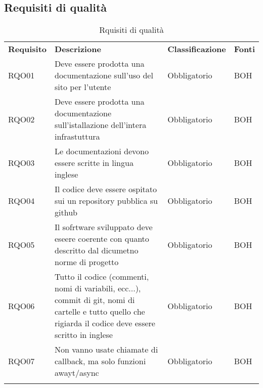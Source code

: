 \subsection{Requisiti di qualità}
\begin{center}
    \centering
    \renewcommand{\arraystretch}{1.8}
    \label{tab:RequisitiQualita}
    \begin{longtable}[!h]{p{50px} p{200px} p{100px} p{50px}}
        \rowcolor{logo!70} \textbf{Requisito} & \textbf{Descrizione}                                                                                                                                        & \textbf{Classificazione} & \textbf{Fonti} \\
        RQO01                                 & Deve essere prodotta una documentazione sull'uso del sito per l'utente                                                                                      & Obbligatorio             & BOH            \\
        RQO02                                 & Deve essere prodotta una documentazione sull'istallazione dell'intera infrastuttura                                                                         & Obbligatorio             & BOH            \\
        RQO03                                 & Le documentazioni devono essere scritte in lingua inglese                                                                                                   & Obbligatorio             & BOH            \\
        RQO04                                 & Il codice deve essere ospitato sui un repository pubblica su github                                                                                         & Obbligatorio             & BOH            \\
        RQO05                                 & Il sofrtware sviluppato deve eseere coerente con quanto descritto dal dicumetno norme di progetto                                                           & Obbligatorio             & BOH            \\
        RQO06                                 & Tutto il codice (commenti, nomi di variabili, ecc...), commit di git, nomi di cartelle e tutto quello che rigiarda il codice deve essere scritto in inglese & Obbligatorio             & BOH            \\
        RQO07                                 & Non vanno usate chiamate di callback, ma solo funzioni awayt/async                                                                                          & Obbligatorio             & BOH            \\
        \rowcolor{white}\caption{Rquisiti di qualità}
    \end{longtable}
\end{center}
